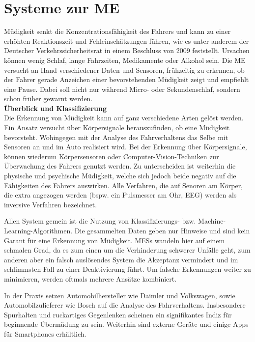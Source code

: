 {\section{Systeme zur \acl{ME}}
\label{chap:me}
Müdigkeit senkt die Konzentrationsfähigkeit des Fahrers und kann zu einer erhöhten Reaktionszeit und Fehleinschätzungen führen, wie es unter anderem der Deutscher Verkehrssicherheitsrat in einem Beschluss von 2009 \cite{DVR:Online} feststellt. Ursachen können wenig Schlaf, lange Fahrzeiten, Medikamente oder Alkohol sein.
Die \acl{ME} versucht an Hand verschiedener Daten und Sensoren, frühzeitig zu erkennen, ob der Fahrer gerade Anzeichen einer bevorstehenden Müdigkeit zeigt und empfiehlt eine Pause.
Dabei soll nicht nur während Micro- oder Sekundenschlaf, sondern schon früher gewarnt werden. \\

\textbf{Überblick und Klassifizierung} \\
Die Erkennung von Müdigkeit kann auf ganz verschiedene Arten gelöst werden. Ein Ansatz versucht über Körpersignale herauszufinden, ob eine Müdigkeit bevorsteht. Wohingegen mit der Analyse des Fahrverhaltens das Selbe mit Sensoren an und im Auto realisiert wird.
Bei der Erkennung über Körpersignale, können wiederum Körpersensoren oder  Computer-Vision-Techniken zur Überwachung des Fahrers genutzt werden. Zu unterscheiden ist weiterhin die physische und psychische Müdigkeit, welche sich jedoch beide negativ auf die Fähigkeiten des Fahrers auswirken. Alle Verfahren, die auf Senoren am Körper, die extra angezogen werden (bspw. ein Pulsmesser am Ohr, EEG) werden als inversive Verfahren bezeichnet.

Allen System gemein ist die Nutzung von Klassifizierungs- bzw. Machine-Learning-Algorithmen. Die gesammelten Daten geben nur Hinweise und sind kein Garant für eine Erkennung von Müdigkeit. \acl{MESs} wandeln hier auf einem schmalen Grad, da es zum einen um die Verhinderung schwerer Unfälle geht, zum anderen aber ein falsch auslösendes System die Akzeptanz vermindert und im schlimmsten Fall zu einer Deaktivierung führt. Um falsche Erkennungen weiter zu minimieren, werden oftmals mehrere Ansätze kombiniert.

In der Praxis setzen Automobilhersteller wie Daimler \cite{Daimler} und Volkswagen, sowie Automobilzulieferer wie Bosch \cite{Bosch} auf die Analyse des Fahrverhaltens. Insbesondere Spurhalten und ruckartiges Gegenlenken scheinen ein signifikantes Indiz für beginnende Übermüdung zu sein. Weiterhin sind externe Geräte und einige Apps für Smartphones erhältlich. \\

}
